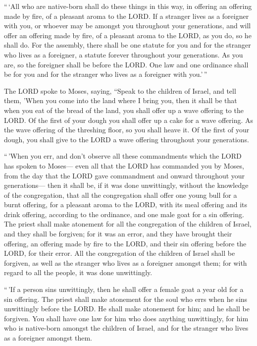  ``\,`All who are native-born shall do these things in this
way, in offering an offering made by fire, of a pleasant aroma to the
LORD.  If a stranger lives as a foreigner with you, or
whoever may be amongst you throughout your generations, and will offer
an offering made by fire, of a pleasant aroma to the LORD, as you do, so
he shall do.  For the assembly, there shall be one statute
for you and for the stranger who lives as a foreigner, a statute forever
throughout your generations. As you are, so the foreigner shall be
before the LORD.  One law and one ordinance shall be for
you and for the stranger who lives as a foreigner with you.'\,''

 The LORD spoke to Moses, saying,  ``Speak to
the children of Israel, and tell them, 'When you come into the land
where I bring you,  then it shall be that when you eat of
the bread of the land, you shall offer up a wave offering to the LORD.
 Of the first of your dough you shall offer up a cake for a
wave offering. As the wave offering of the threshing floor, so you shall
heave it.  Of the first of your dough, you shall give to
the LORD a wave offering throughout your generations.

 ``\,'When you err, and don't observe all these
commandments which the LORD has spoken to Moses---  even
all that the LORD has commanded you by Moses, from the day that the LORD
gave commandment and onward throughout your generations--- 
then it shall be, if it was done unwittingly, without the knowledge of
the congregation, that all the congregation shall offer one young bull
for a burnt offering, for a pleasant aroma to the LORD, with its meal
offering and its drink offering, according to the ordinance, and one
male goat for a sin offering.  The priest shall make
atonement for all the congregation of the children of Israel, and they
shall be forgiven; for it was an error, and they have brought their
offering, an offering made by fire to the LORD, and their sin offering
before the LORD, for their error.  All the congregation of
the children of Israel shall be forgiven, as well as the stranger who
lives as a foreigner amongst them; for with regard to all the people, it
was done unwittingly.

 ``\,'If a person sins unwittingly, then he shall offer a
female goat a year old for a sin offering.  The priest
shall make atonement for the soul who errs when he sins unwittingly
before the LORD. He shall make atonement for him; and he shall be
forgiven.  You shall have one law for him who does anything
unwittingly, for him who is native-born amongst the children of Israel,
and for the stranger who lives as a foreigner amongst them.

